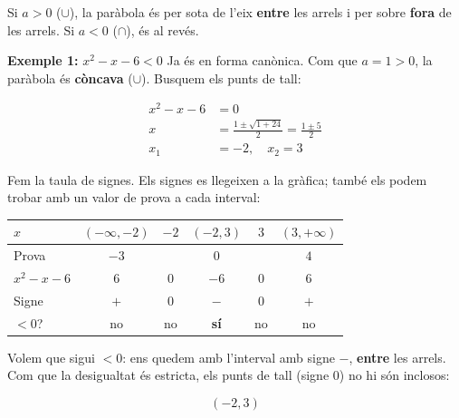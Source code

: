 Si $a>0$ ($\cup$), la paràbola és per sota de l'eix \textbf{entre} les arrels i per sobre \textbf{fora} de les arrels. Si $a<0$ ($\cap$), és al revés.

\begin{exemple}{\textbf{Exemple 1:} $x^2-x-6<0$}
Ja és en forma canònica. Com que $a=1>0$, la paràbola és \textbf{còncava} ($\cup$). Busquem els punts de tall:

\[
\begin{aligned}
x^2-x-6&=0\\
x&=\frac{1\pm\sqrt{1+24}}{2}=\frac{1\pm 5}{2}\\
x_1&=-2,\quad x_2=3
\end{aligned}
\]

\begin{center}
\end{center}

Fem la taula de signes. Els signes es llegeixen a la gràfica; també els podem trobar amb un valor de prova a cada interval:

\begin{center}
\begin{tabular}{lccccc}
\toprule
$x$ & $(-\infty,-2)$ & $-2$ & $(-2,3)$ & $3$ & $(3,+\infty)$ \\
\midrule
Prova & $-3$ &  & $0$ &  & $4$ \\
$x^2-x-6$ & $6$ & $0$ & $-6$ & $0$ & $6$ \\
Signe & $+$ & $0$ & $-$ & $0$ & $+$ \\
$<0$? & no & no & \textbf{sí} & no & no \\
\bottomrule
\end{tabular}
\end{center}

Volem que sigui $<0$: ens quedem amb l'interval amb signe $-$, \textbf{entre} les arrels. Com que la desigualtat és estricta, els punts de tall (signe $0$) no hi són inclosos:

\[
(-2,3)
\]
\end{exemple}

